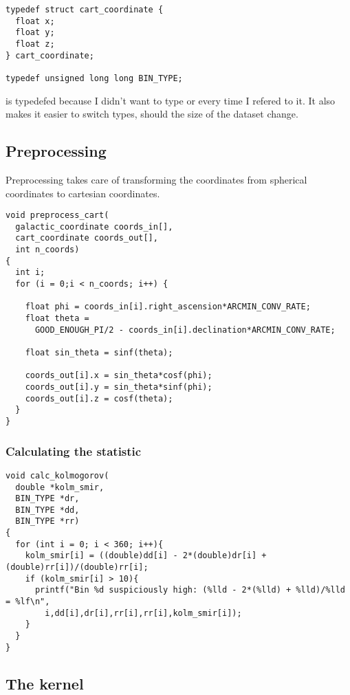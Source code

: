 \documentclass[a4paper,titlepage,12pt]{article}
\begin{document}
\begin{description}[left = \parindent]
\begin{lstlisting}
typedef struct cart_coordinate {
  float x;
  float y;
  float z;
} cart_coordinate;

typedef unsigned long long BIN_TYPE;
\end{lstlisting}


\noindent{} is typedefed because I didn't want to type  or  every time I refered to it.
It also makes it easier to switch types, should the size of the dataset change.
\newpage
\subsection{Preprocessing}

Preprocessing takes care of transforming the coordinates from spherical coordinates to cartesian coordinates.

\begin{lstlisting}
void preprocess_cart(
  galactic_coordinate coords_in[],
  cart_coordinate coords_out[],
  int n_coords)
{
  int i;
  for (i = 0;i < n_coords; i++) {

    float phi = coords_in[i].right_ascension*ARCMIN_CONV_RATE;
    float theta = 
      GOOD_ENOUGH_PI/2 - coords_in[i].declination*ARCMIN_CONV_RATE;

    float sin_theta = sinf(theta);

    coords_out[i].x = sin_theta*cosf(phi);
    coords_out[i].y = sin_theta*sinf(phi);
    coords_out[i].z = cosf(theta);
  }
}
\end{lstlisting}

\subsubsection{Calculating the statistic}

\begin{lstlisting}
void calc_kolmogorov(
  double *kolm_smir,
  BIN_TYPE *dr,
  BIN_TYPE *dd,
  BIN_TYPE *rr)
{
  for (int i = 0; i < 360; i++){
    kolm_smir[i] = ((double)dd[i] - 2*(double)dr[i] + (double)rr[i])/(double)rr[i];
    if (kolm_smir[i] > 10){
      printf("Bin %d suspiciously high: (%lld - 2*(%lld) + %lld)/%lld = %lf\n",
        i,dd[i],dr[i],rr[i],rr[i],kolm_smir[i]);
    }
  }
}
\end{lstlisting}

\newpage
\subsection{The kernel}


\end{description}
\end{document}
